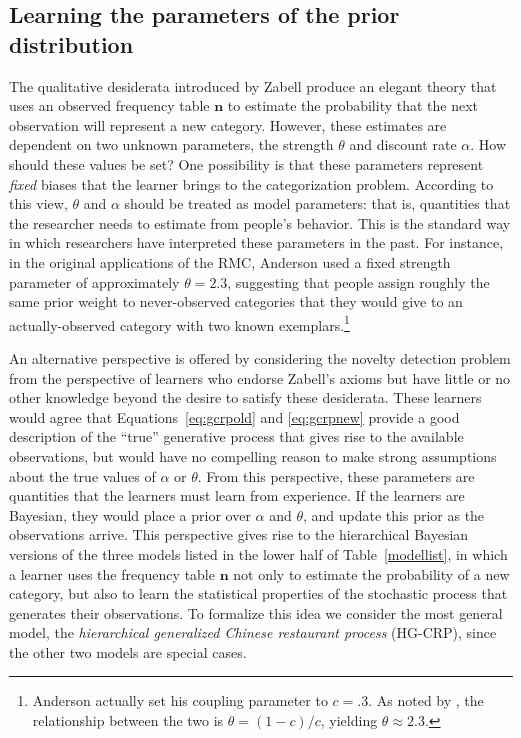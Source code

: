 \documentclass[doc]{apa6}
\begin{document}
\subsection{Learning the parameters of the prior distribution}

The qualitative desiderata introduced by Zabell produce an elegant theory that uses an observed frequency table $\bm{n}$ to estimate the probability that the next observation will represent a new category. However, these estimates are dependent on two unknown parameters, the strength $\theta$ and discount rate $\alpha$. How should these values be set? One possibility is that these parameters represent {\it fixed} biases that the learner brings to the categorization problem. According to this view, $\theta$ and $\alpha$ should be treated as model parameters: that is, quantities that the researcher needs to estimate from people's behavior. This is the standard way in which researchers have interpreted these parameters in the past. For instance, in the original applications of the RMC, Anderson \citeyear{anderson_adaptive_1991} used a fixed strength parameter of approximately $\theta=2.3$, suggesting that people assign roughly the same prior weight to never-observed categories that they would give to an actually-observed category with two known exemplars.\footnote{Anderson actually set his coupling parameter to $c=.3$. As noted by , the relationship between the two is $\theta=(1-c)/c$, yielding $\theta \approx 2.3$.}

An alternative perspective is offered by considering the novelty detection problem from the perspective of learners who endorse Zabell's axioms but have little or no other knowledge beyond the desire to satisfy these desiderata. These learners would agree that Equations~\ref{eq:gcrpold} and \ref{eq:gcrpnew} provide a good description of the ``true'' generative process that gives rise to the available observations, but would have no compelling reason to make strong assumptions about the true values of $\alpha$ or $\theta$. From this perspective, these parameters are quantities that the learners must learn from experience. If the learners are Bayesian, they would place a prior over $\alpha$ and $\theta$, and update this prior as the observations arrive. This perspective gives rise to the hierarchical Bayesian versions of the three models listed in the lower half of Table~\ref{modellist}, in which a learner uses the frequency table $\bm{n}$ not only to estimate the probability of a new category, but also to learn the statistical properties of the stochastic process that generates their observations. To formalize this idea we consider the most general model, the {\it hierarchical generalized Chinese restaurant process} (HG-CRP), since the other two models are special cases.
\end{document}
